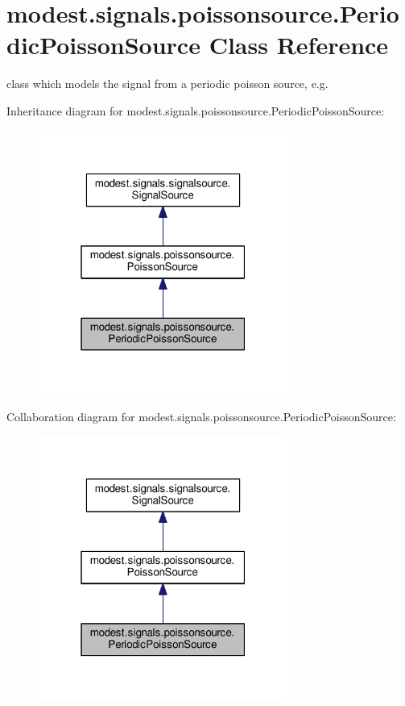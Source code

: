 \hypertarget{classmodest_1_1signals_1_1poissonsource_1_1PeriodicPoissonSource}{}\section{modest.\+signals.\+poissonsource.\+Periodic\+Poisson\+Source Class Reference}
\label{classmodest_1_1signals_1_1poissonsource_1_1PeriodicPoissonSource}


class which models the signal from a periodic poisson source, e.\+g.  




Inheritance diagram for modest.\+signals.\+poissonsource.\+Periodic\+Poisson\+Source\+:\nopagebreak
\begin{figure}[H]
\begin{center}
\leavevmode
\includegraphics[width=232pt]{classmodest_1_1signals_1_1poissonsource_1_1PeriodicPoissonSource__inherit__graph}
\end{center}
\end{figure}


Collaboration diagram for modest.\+signals.\+poissonsource.\+Periodic\+Poisson\+Source\+:\nopagebreak
\begin{figure}[H]
\begin{center}
\leavevmode
\includegraphics[width=232pt]{classmodest_1_1signals_1_1poissonsource_1_1PeriodicPoissonSource__coll__graph}
\end{center}
\end{figure}
